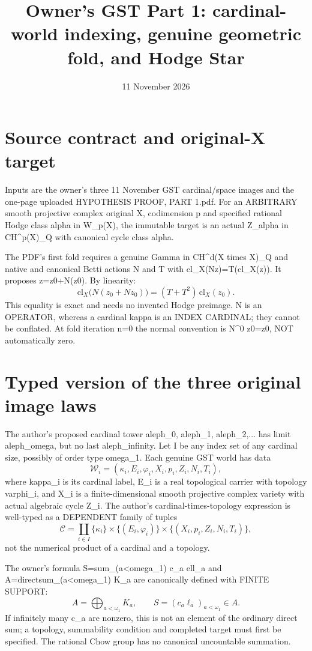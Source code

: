 \documentclass[11pt]{article}
\title{Owner's GST Part 1: cardinal-world indexing, genuine geometric fold, and Hodge Star}
\date{11 November 2026}
\begin{document}
\maketitle

\section{Source contract and original-X target}
Inputs are the owner's three 11 November GST cardinal/space images
and the one-page uploaded HYPOTHESIS PROOF, PART 1.pdf.
For an ARBITRARY smooth projective complex original X,
codimension p and specified rational Hodge class
alpha in W_p(X), the immutable target is an actual
Z_alpha in CH^p(X)_Q with canonical cycle class alpha.

The PDF's first fold requires a genuine
Gamma in CH^d(X times X)_Q and
native and canonical Betti actions N and T
with cl_X(Nz)=T(cl_X(z)).
It proposes z=z0+N(z0). By linearity:
\[
\boxed{\mathrm{cl}_X\bigl(N(z_0+Nz_0)\bigr)
=(T+T^2)\,\mathrm{cl}_X(z_0).}
\]
This equality is exact and needs no invented Hodge preimage.
N is an OPERATOR, whereas a cardinal kappa is an
INDEX CARDINAL; they cannot be conflated.
At fold iteration n=0 the normal convention is
N^0 z0=z0, NOT automatically zero.

\section{Typed version of the three original image laws}
The author's proposed cardinal tower
aleph_0, aleph_1, aleph_2,... has
limit aleph_omega, but no last aleph_infinity.
Let I be any index set of any cardinal size,
possibly of order type omega_1.
Each genuine GST world has data
\[
\mathcal W_i=(\kappa_i,E_i,\varphi_i,X_i,p_i,Z_i,N_i,T_i),
\]
where kappa_i is its cardinal label,
E_i is a real topological carrier with topology
varphi_i, and X_i is a finite-dimensional
smooth projective complex variety with
actual algebraic cycle Z_i.
The author's cardinal-times-topology expression is
well-typed as a DEPENDENT family of tuples
\[
\mathcal C=\coprod_{i\in I}
\{\kappa_i\}\times\{(E_i,\varphi_i)\}
\times\{(X_i,p_i,Z_i,N_i,T_i)\},
\]
not the numerical product of a cardinal and a topology.

The owner's formula
S=sum_(a<omega_1) c_a ell_a and
A=directsum_(a<omega_1) K_a
are canonically defined with FINITE SUPPORT:
\[
\boxed{A=\bigoplus_{a<\omega_1}K_a,\qquad
S=(c_a\ell_a)_{a<\omega_1}\in A.}
\]
If infinitely many c_a are nonzero, this is not
an element of the ordinary direct sum; a topology,
summability condition and completed target must first
be specified. The rational Chow group has no canonical
uncountable summation.
\end{document}

